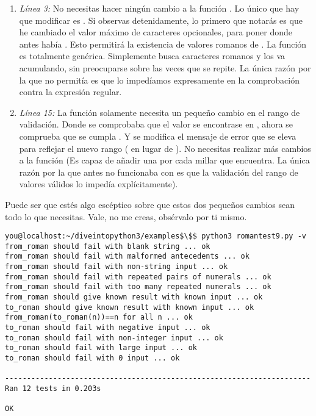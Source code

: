 \begin{enumerate}

\item \emph{Línea 3:} No necesitas hacer ningún cambio a la función . Lo único que hay que modificar es . Si observas detenidamente, lo primero que notarás es que he cambiado el valor máximo de caracteres  opcionales, para poner  donde antes había . Esto permitirá la existencia de valores romanos de . La función  es totalmente genérica. Simplemente busca caracteres romanos y los va acumulando, sin preocuparse sobre las veces que se repite. La única razón por la que no permitía  es que lo impedíamos expresamente en la comprobación contra la expresión regular.

\item \emph{Línea 15:} La función  solamente necesita un pequeño cambio en el rango de validación. Donde se comprobaba que el valor se encontrase en , ahora se comprueba que se cumpla . Y se modifica el mensaje de error que se eleva para reflejar el nuevo rango ( en lugar de ). No necesitas realizar más cambios a la función (Es capaz de añadir una  por cada millar que encuentra. La única razón por la que antes no funcionaba con  es que la validación del rango de valores válidos lo impedía explícitamente).

\end{enumerate}

Puede ser que estés algo escéptico sobre que estos dos pequeños cambios sean todo lo que necesitas. Vale, no me creas, obsérvalo por ti mismo.

\noindent\begin{minipage}{\textwidth}
\begin{lstlisting}[mathescape=True]
you@localhost:~/diveintopython3/examples$\$$ python3 romantest9.py -v
from_roman should fail with blank string ... ok
from_roman should fail with malformed antecedents ... ok
from_roman should fail with non-string input ... ok
from_roman should fail with repeated pairs of numerals ... ok
from_roman should fail with too many repeated numerals ... ok
from_roman should give known result with known input ... ok
to_roman should give known result with known input ... ok
from_roman(to_roman(n))==n for all n ... ok
to_roman should fail with negative input ... ok
to_roman should fail with non-integer input ... ok
to_roman should fail with large input ... ok
to_roman should fail with 0 input ... ok

----------------------------------------------------------------------
Ran 12 tests in 0.203s

OK
\end{lstlisting}
\end{minipage}


